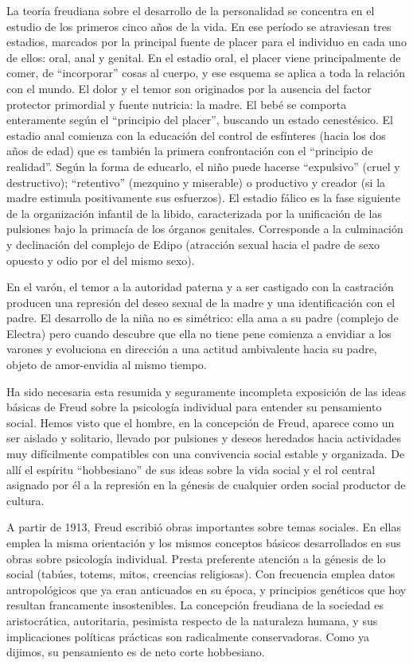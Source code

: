 \documentclass[
]{book}
\begin{document}
La teoría freudiana sobre el desarrollo de la personalidad se concentra en el estudio de los primeros cinco años de la vida. En ese período se atraviesan tres estadios, marcados por la principal fuente de placer para el individuo en cada uno de ellos: oral, anal y genital. En el estadio oral, el placer viene principalmente de comer, de ``incorporar'' cosas al cuerpo, y ese esquema se aplica a toda la relación con el mundo. El dolor y el temor son originados por la ausencia del factor protector primordial y fuente nutricia: la madre. El bebé se comporta enteramente según el ``principio del placer'', buscando un estado cenestésico. El estadio anal comienza con la educación del control de esfínteres (hacia los dos años de edad) que es también la primera confrontación con el ``principio de realidad''. Según la forma de educarlo, el niño puede hacerse ``expulsivo'' (cruel y destructivo); ``retentivo'' (mezquino y miserable) o productivo y creador (si la madre estimula positivamente sus esfuerzos). El estadio fálico es la fase siguiente de la organización infantil de la libido, caracterizada por la unificación de las pulsiones bajo la primacía de los órganos genitales. Corresponde a la culminación y declinación del complejo de Edipo (atracción sexual hacia el padre de sexo opuesto y odio por el del mismo sexo).

En el varón, el temor a la autoridad paterna y a ser castigado con la castración producen una represión del deseo sexual de la madre y una identificación con el padre. El desarrollo de la niña no es simétrico: ella ama a su padre (complejo de Electra) pero cuando descubre que ella no tiene pene comienza a envidiar a los varones y evoluciona en dirección a una actitud ambivalente hacia su padre, objeto de amor-envidia al mismo tiempo.

Ha sido necesaria esta resumida y seguramente incompleta exposición de las ideas básicas de Freud sobre la psicología individual para entender su pensamiento social. Hemos visto que el hombre, en la concepción de Freud, aparece como un ser aislado y solitario, llevado por pulsiones y deseos heredados hacia actividades muy difícilmente compatibles con una convivencia social estable y organizada. De allí el espíritu ``hobbesiano'' de sus ideas sobre la vida social y el rol central asignado por él a la represión en la génesis de cualquier orden social productor de cultura.

A partir de 1913, Freud escribió obras importantes sobre temas sociales. En ellas emplea la misma orientación y los mismos conceptos básicos desarrollados en sus obras sobre psicología individual. Presta preferente atención a la génesis de lo social (tabúes, totems, mitos, creencias religiosas). Con frecuencia emplea datos antropológicos que ya eran anticuados en su época, y principios genéticos que hoy resultan francamente insostenibles. La concepción freudiana de la sociedad es aristocrática, autoritaria, pesimista respecto de la naturaleza humana, y sus implicaciones políticas prácticas son radicalmente conservadoras. Como ya dijimos, su pensamiento es de neto corte hobbesiano.
\end{document}

